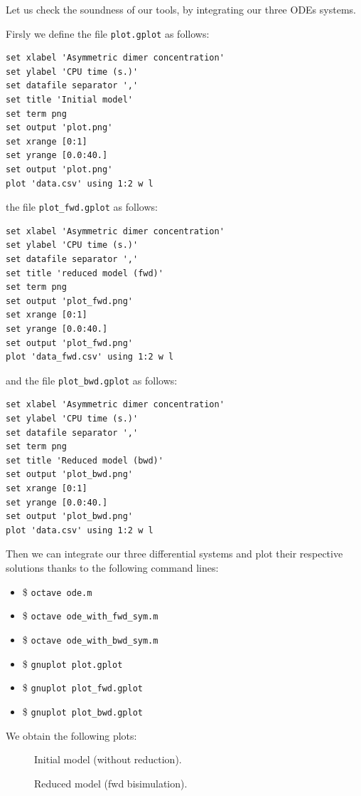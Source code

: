 \documentclass[11pt]{book}
\def\ttt#1{\texttt{#1}}
\def\ITE#1{\begin{itemize}#1\end{itemize}}
\begin{document}
Let us check the soundness of our tools, by integrating our three  ODEs systems.

Firsly we define the file \texttt{plot.gplot} as follows:
\begin{lstlisting}[language=Gnuplot]
set xlabel 'Asymmetric dimer concentration'
set ylabel 'CPU time (s.)'
set datafile separator ','
set title 'Initial model'
set term png
set output 'plot.png'
set xrange [0:1]
set yrange [0.0:40.]
set output 'plot.png'
plot 'data.csv' using 1:2 w l
\end{lstlisting}
the file \texttt{plot\_fwd.gplot} as follows:
\begin{lstlisting}[language=Gnuplot]
set xlabel 'Asymmetric dimer concentration'
set ylabel 'CPU time (s.)'
set datafile separator ','
set title 'reduced model (fwd)'
set term png
set output 'plot_fwd.png'
set xrange [0:1]
set yrange [0.0:40.]
set output 'plot_fwd.png'
plot 'data_fwd.csv' using 1:2 w l
\end{lstlisting}
and the file \texttt{plot\_bwd.gplot} as follows:
\begin{lstlisting}[language=Gnuplot]
set xlabel 'Asymmetric dimer concentration'
set ylabel 'CPU time (s.)'
set datafile separator ','
set term png
set title 'Reduced model (bwd)'
set output 'plot_bwd.png'
set xrange [0:1]
set yrange [0.0:40.]
set output 'plot_bwd.png'
plot 'data.csv' using 1:2 w l
\end{lstlisting}

Then we can integrate our three differential systems and plot their respective  solutions thanks to the following command lines:
\ITE{
\item[\$] \ttt{octave ode.m}
\item[\$] \ttt{octave ode\_with\_fwd\_sym.m}
\item[\$] \ttt{octave ode\_with\_bwd\_sym.m}
\item[\$] \ttt{gnuplot plot.gplot}
\item[\$] \ttt{gnuplot plot\_fwd.gplot}
\item[\$] \ttt{gnuplot plot\_bwd.gplot}}

We obtain the following plots:
\begin{figure}[htp]
\centering  \begin{minipage}{0.35\linewidth}
\end{minipage}
\caption{Initial model (without reduction).}
\end{figure}

\begin{figure}[htp]
\centering\begin{minipage}{0.35\linewidth}
\end{minipage}
\caption{Reduced model (fwd bisimulation).}
\end{figure}
\end{document}
